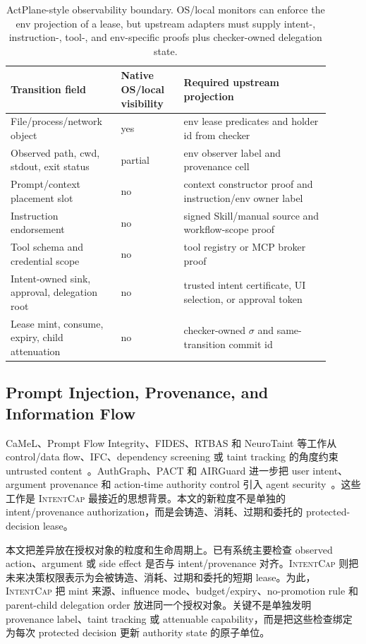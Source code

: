 \documentclass[UTF8,a4paper,11pt]{ctexart}
\newcommand{\sys}{\textsc{IntentCap}\xspace}
\begin{document}
\begin{table}[t]
\centering
\scriptsize
\setlength{\tabcolsep}{2pt}
\caption{ActPlane-style observability boundary. OS/local monitors can enforce the env projection of a lease, but upstream adapters must supply intent-, instruction-, tool-, and env-specific proofs plus checker-owned delegation state.}
\label{tab:actplane-observability}
\begin{tabular}{p{0.30\linewidth}p{0.18\linewidth}p{0.42\linewidth}}
\toprule
Transition field & Native OS/local visibility & Required upstream projection \\
\midrule
File/process/network object & yes & env lease predicates and holder id from checker \\
Observed path, cwd, stdout, exit status & partial & env observer label and provenance cell \\
Prompt/context placement slot & no & context constructor proof and instruction/env owner label \\
Instruction endorsement & no & signed Skill/manual source and workflow-scope proof \\
Tool schema and credential scope & no & tool registry or MCP broker proof \\
Intent-owned sink, approval, delegation root & no & trusted intent certificate, UI selection, or approval token \\
Lease mint, consume, expiry, child attenuation & no & checker-owned \(\sigma\) and same-transition commit id \\
\bottomrule
\end{tabular}
\end{table}

\subsection{Prompt Injection, Provenance, and Information Flow}
CaMeL、Prompt Flow Integrity、FIDES、RTBAS 和 NeuroTaint 等工作从 control/data flow、IFC、dependency screening 或 taint tracking 的角度约束 untrusted content~\cite{camel,prompt-flow-integrity,fides,rtbas,neurotaint}。AuthGraph、PACT 和 AIRGuard 进一步把 user intent、argument provenance 和 action-time authority control 引入 agent security~\cite{authgraph,pact,airguard}。这些工作是 \sys 最接近的思想背景。本文的新粒度不是单独的 intent/provenance authorization，而是会铸造、消耗、过期和委托的 protected-decision lease。

本文把差异放在授权对象的粒度和生命周期上。已有系统主要检查 observed action、argument 或 side effect 是否与 intent/provenance 对齐。\sys 则把未来决策权限表示为会被铸造、消耗、过期和委托的短期 lease。为此，\sys 把 mint 来源、influence mode、budget/expiry、no-promotion rule 和 parent-child delegation order 放进同一个授权对象。关键不是单独发明 provenance label、taint tracking 或 attenuable capability，而是把这些检查绑定为每次 protected decision 更新 authority state 的原子单位。
\end{document}
